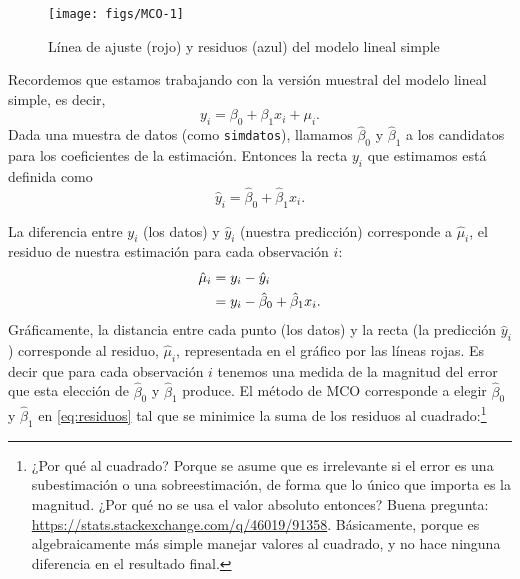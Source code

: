 \documentclass{report}\usepackage[]{graphicx}\usepackage[]{color}
\newenvironment{knitrout}{}{} %
\begin{document}
\begin{knitrout}
\color{fgcolor}\begin{figure}

{\centering \texttt{[image: figs/MCO-1]} 

}

\caption[Línea de ajuste (rojo) y residuos (azul) del modelo lineal simple]{Línea de ajuste (rojo) y residuos (azul) del modelo lineal simple}\label{fig:MCO}
\end{figure}


\end{knitrout}

Recordemos que estamos trabajando con la versión muestral del modelo lineal simple, es decir,
\begin{equation*}
y_i = \beta_0 + \beta_1 x_i + \mu_i.
\end{equation*}
Dada una muestra de datos (como \verb|simdatos|), llamamos $\hat\beta_0$ y $\hat\beta_1$ a los candidatos para los coeficientes de la estimación. Entonces la recta $y_i$ que estimamos está definida como
\begin{equation}
\hat y_i = \hat\beta_0 + \hat\beta_1 x_i.
\end{equation}

La diferencia entre $y_i$ (los datos) y $\hat y_i$ (nuestra predicción) corresponde a $\hat\mu_i$, el residuo de nuestra estimación para cada observación $i$: 
\begin{align}
\hat \mu_i &= y_i - \hat y_i \notag \\
           &= y_i - \hat\beta_0 + \hat\beta_1 x_i.
\label{eq:residuos}
\end{align}
Gráficamente, la distancia entre cada punto (los datos) y la recta (la predicción $\hat y_i$)  corresponde al residuo, $\hat\mu_i$, representada en el gráfico por las líneas rojas. 
Es decir que para cada observación $i$ tenemos una medida de la magnitud del error que esta elección de $\hat\beta_0$ y $\hat\beta_1$ produce.
El método de MCO corresponde a elegir $\hat\beta_0$ y $\hat\beta_1$ en \eqref{eq:residuos} tal que se minimice la suma de los residuos al cuadrado:\footnote{¿Por qué al cuadrado? Porque se asume que es irrelevante si el error es una subestimación o una sobreestimación, de forma que lo único que importa es la magnitud. ¿Por qué no se usa el valor absoluto entonces? Buena pregunta: \url{https://stats.stackexchange.com/q/46019/91358}. Básicamente, porque es algebraicamente más simple manejar valores al cuadrado, y no hace ninguna diferencia en el resultado final.}
\end{document}

